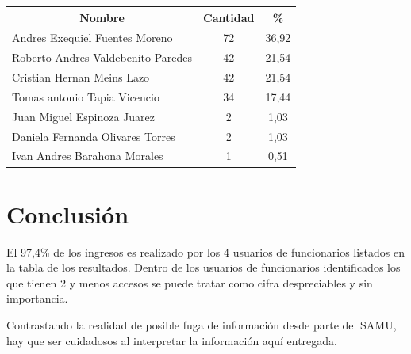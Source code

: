 \documentclass{article}
\begin{document}
\begin{table}[h]
\begin{tabular}{@{}lcc@{}}
\toprule
\multicolumn{1}{c}{\textbf{Nombre}} & \multicolumn{1}{c}{\textbf{Cantidad}} & \multicolumn{1}{c}{\textbf{\%}} \\ \midrule
Andres Exequiel Fuentes Moreno      & 72                                    & 36,92                           \\
Roberto Andres Valdebenito Paredes  & 42                                    & 21,54                           \\
Cristian Hernan Meins Lazo          & 42                                    & 21,54                           \\
Tomas antonio Tapia Vicencio        & 34                                    & 17,44                           \\
Juan Miguel Espinoza Juarez         & 2                                     & 1,03                            \\
Daniela Fernanda Olivares Torres    & 2                                     & 1,03                            \\
Ivan Andres Barahona Morales        & 1                                     & 0,51                            \\ \bottomrule
\end{tabular}
\end{table}

\section{Conclusión}
El 97,4\% de los ingresos es realizado por  los 4 usuarios de funcionarios listados en la tabla de los resultados. Dentro de los usuarios de funcionarios identificados los que tienen 2 y menos accesos se puede tratar como cifra despreciables y sin importancia.

Contrastando la realidad de posible fuga de información desde parte del SAMU, hay que ser cuidadosos al interpretar la información aquí entregada.
\end{document}
